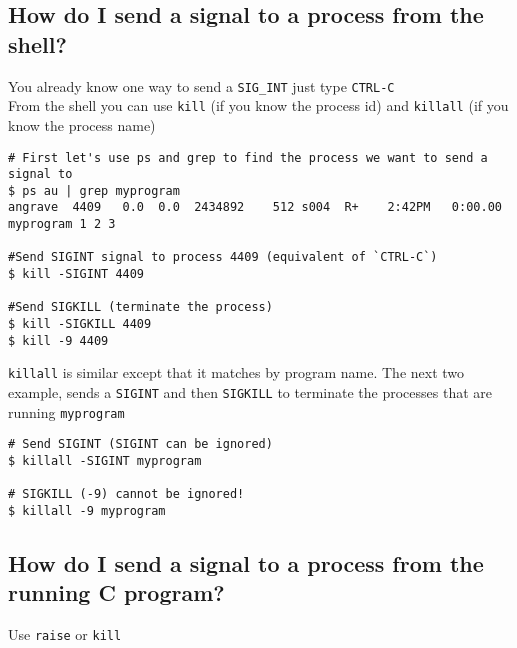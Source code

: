 \subsection{How do I send a signal to a process from the
shell?}\label{how-do-i-send-a-signal-to-a-process-from-the-shell}

You already know one way to send a \texttt{SIG\_INT} just type
\texttt{CTRL-C}\\From the shell you can use \texttt{kill} (if you know
the process id) and \texttt{killall} (if you know the process name)

\begin{verbatim}
# First let's use ps and grep to find the process we want to send a signal to
$ ps au | grep myprogram
angrave  4409   0.0  0.0  2434892    512 s004  R+    2:42PM   0:00.00 myprogram 1 2 3

#Send SIGINT signal to process 4409 (equivalent of `CTRL-C`)
$ kill -SIGINT 4409

#Send SIGKILL (terminate the process)
$ kill -SIGKILL 4409
$ kill -9 4409
\end{verbatim}

\texttt{killall} is similar except that it matches by program name. The
next two example, sends a \texttt{SIGINT} and then \texttt{SIGKILL} to
terminate the processes that are running \texttt{myprogram}

\begin{verbatim}
# Send SIGINT (SIGINT can be ignored)
$ killall -SIGINT myprogram

# SIGKILL (-9) cannot be ignored! 
$ killall -9 myprogram
\end{verbatim}

\subsection{How do I send a signal to a process from the running C
program?}\label{how-do-i-send-a-signal-to-a-process-from-the-running-c-program}

Use \texttt{raise} or \texttt{kill}

\begin{Shaded}
\begin{Highlighting}[]
  
  
\end{Highlighting}
\end{Shaded}

